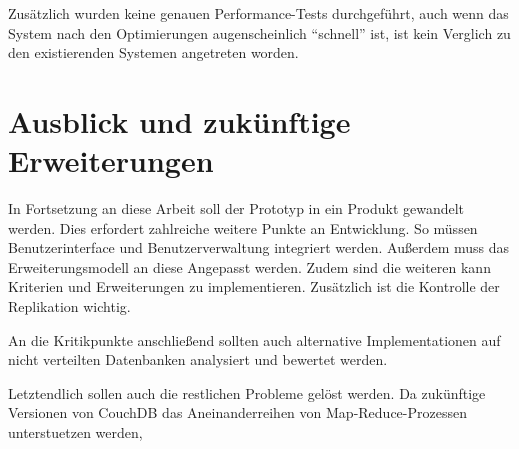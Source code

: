 Zusätzlich wurden keine genauen Performance-Tests durchgeführt,
auch wenn das System nach den Optimierungen augenscheinlich ``schnell'' ist,
ist kein Verglich zu den existierenden Systemen angetreten worden.




\section{Ausblick und zukünftige Erweiterungen}

In Fortsetzung an diese Arbeit soll der Prototyp in ein Produkt gewandelt werden.
Dies erfordert zahlreiche weitere Punkte an Entwicklung.
So müssen Benutzerinterface und Benutzerverwaltung integriert werden.
Außerdem muss das Erweiterungsmodell an diese Angepasst werden.
Zudem sind die weiteren kann Kriterien und Erweiterungen zu implementieren.
Zusätzlich ist die Kontrolle der Replikation wichtig.

An die Kritikpunkte anschließend sollten auch alternative Implementationen auf nicht verteilten Datenbanken analysiert und bewertet werden.

Letztendlich sollen auch die restlichen Probleme gelöst werden.
Da zukünftige Versionen von CouchDB das Aneinanderreihen von Map-Reduce-Prozessen unterstuetzen werden,
